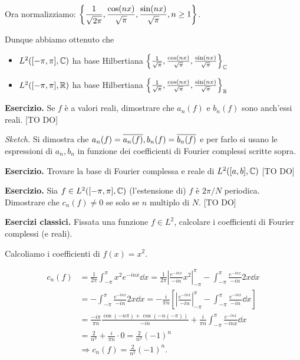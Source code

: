 Ora normalizziamo: $\displaystyle \left\{ \frac{1}{\sqrt{2\pi}}, \frac{\cos(nx)}{\sqrt{\pi}}, \frac{\sin(nx)}{\sqrt{\pi}}, n \geq 1 \right\}$.

Dunque abbiamo ottenuto che
\begin{itemize}

	\item $L^2( [-\pi,\pi], \mathbb C)$ ha base Hilbertiana $\left\{ \frac{1}{\sqrt{\pi}}, \frac{\cos(nx)}{\sqrt{\pi}}, \frac{\sin(nx)}{\sqrt{\pi}} \right\}_{\mathbb C}$


	\item $L^2( [-\pi,\pi], \mathbb R)$ ha base Hilbertiana $\left\{ \frac{1}{\sqrt{\pi}}, \frac{\cos(nx)}{\sqrt{\pi}}, \frac{\sin(nx)}{\sqrt{\pi}} \right\}_{\mathbb R}$ 

\end{itemize}

\textbf{Esercizio.}  Se $f$ è a valori reali, dimostrare che $a_n(f)$ e $b_n(f)$ sono anch'essi reali. [TO DO]

\textit{Sketch.} Si dimostra che $a_n(f) = \overline{a_n(f)}, b_n(f) = \overline{b_n(f)}$ e per farlo si usano le espressioni di $a_n, b_n$ in funzione dei coefficienti di Fourier complessi scritte sopra.


\textbf{Esercizio.} Trovare la base di Fourier complessa e reale di $L^2([a,b], \mathbb C) $ [TO DO]


\textbf{Esercizio.} Sia $f \in L^2([-\pi,\pi], \mathbb C) $ (l'estensione di) $f$ è $2\pi / N$ periodica. Dimostrare che $c_n(f) \neq 0$ se solo se $n$ multiplo di $N$. [TO DO]


\textbf{Esercizi classici.} Fissata una funzione $f \in L^2$, calcolare i coefficienti di Fourier complessi (e reali).

Calcoliamo i coefficienti di $f(x) = x^2$.

\begin{align*}
	c_n(f) & = \frac{1}{2\pi} \int_{-\pi}^\pi x^2 e^{-inx} \dd x = \frac{1}{2\pi} \left| \frac{e^{-inx}}{-in} x^2 \right|_{-\pi}^\pi - \int_{-\pi}^\pi \frac{e^{-inx}}{-in} 2x \dd x \\
	& = - \int_{-\pi}^\pi \frac{e^{-inx}}{-in} 2x \dd x = -\frac{i}{\pi n} \left[ \left| \frac{e^{-inx}}{-in} \right|_{-\pi}^\pi - \int_{-\pi}^\pi \frac{e^{-inx}}{-in} \dd x  \right] \\
	& = \frac{-i \pi}{\pi n} \frac{\cos(-n\pi) + \cos(-n (-\pi))}{-in} + \frac{i}{\pi n} \int_{-\pi}^\pi \frac{e^{-inx}}{-inx} \dd x \\
	& = \frac{2}{n^2} + \frac{i}{\pi n} \cdot 0 = \frac{2}{n^2} (-1)^n \\
	& \Longrightarrow c_n(f) = \frac{2}{n^2} (-1)^n.
\end{align*}

